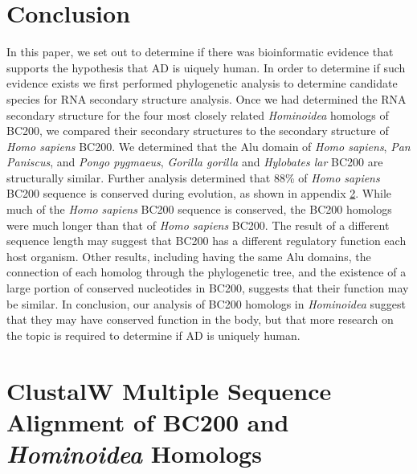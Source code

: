 \documentclass[conference, 11pt]{IEEEtran}
\begin{document}
\section{Conclusion}\label{sec:conclusion}

In this paper, we set out to determine if there was bioinformatic evidence that supports the hypothesis that AD is uiquely human. 
In order to determine if such evidence exists we first performed phylogenetic analysis to determine candidate species for RNA secondary structure analysis. 
Once we had determined the RNA secondary structure for the four most closely related \emph{Hominoidea} homologs of BC200, we compared their secondary structures to the secondary structure of \emph{Homo sapiens} BC200. 
We determined that the Alu domain of \emph{Homo sapiens}, \emph{Pan Paniscus}, and \emph{Pongo pygmaeus}, \emph{Gorilla gorilla} and \emph{Hylobates lar} BC200 are structurally similar. 
Further analysis determined that 88\% of \emph{Homo sapiens} BC200 sequence is conserved during evolution, as shown in appendix \ref{app:A}. 
While much of the \emph{Homo sapiens} BC200 sequence is conserved, the BC200 homologs were much longer than that of \emph{Homo sapiens} BC200.
The result of a different sequence length may suggest that BC200 has a different regulatory function each host organism. 
Other results, including having the same Alu domains, the connection of each homolog through the phylogenetic tree, and the existence of a large portion of conserved nucleotides in BC200, suggests that their function may be similar. 
In conclusion, our analysis of BC200 homologs in \emph{Hominoidea} suggest that they may have conserved function in the body, but that more research on the topic is required to determine if AD is uniquely human.




\vspace{4cm}

\onecolumn
\appendices

\section{ClustalW Multiple Sequence Alignment of BC200 and \emph{Hominoidea} Homologs}
\label{app:A}
\end{document}

